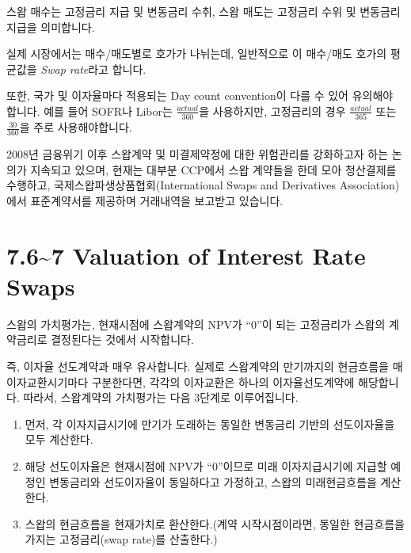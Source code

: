 \documentclass[
  letterpaper,
  DIV=11,
  numbers=noendperiod]{scrreprt}
\providecommand{\tightlist}{%
  \setlength{\itemsep}{0pt}\setlength{\parskip}{0pt}}\usepackage{longtable,booktabs,array}
\begin{document}
\begin{tcolorbox}[enhanced jigsaw, titlerule=0mm, bottomtitle=1mm, left=2mm, title=\textcolor{quarto-callout-tip-color}{\faLightbulb}\hspace{0.5em}{The organization of swap trading}, toptitle=1mm, bottomrule=.15mm, colframe=quarto-callout-tip-color-frame, breakable, opacityback=0, rightrule=.15mm, opacitybacktitle=0.6, coltitle=black, colback=white, arc=.35mm, colbacktitle=quarto-callout-tip-color!10!white, toprule=.15mm, leftrule=.75mm]

스왑 매수는 고정금리 지급 및 변동금리 수취, 스왑 매도는 고정금리 수위 및
변동금리 지급을 의미합니다.

실제 시장에서는 매수/매도별로 호가가 나뉘는데, 일반적으로 이 매수/매도
호가의 평균값을 \emph{Swap rate}라고 합니다.

또한, 국가 및 이자율마다 적용되는 Day count convention이 다를 수 있어
유의해야 합니다. 예를 들어 SOFR나 Libor는 \(\frac{actual}{360}\)을
사용하지만, 고정금리의 경우 \(\frac{actual}{365}\) 또는
\(\frac{30}{360}\)을 주로 사용해야합니다.

2008년 금융위기 이후 스왑계약 및 미결제약정에 대한 위험관리를 강화하고자
하는 논의가 지속되고 있으며, 현재는 대부분 CCP에서 스왑 계약들을 한데
모아 청산결제를 수행하고, 국제스왑파생상품협회(International Swaps and
Derivatives Association)에서 표준계약서를 제공하며 거래내역을 보고받고
있습니다.

\end{tcolorbox}

\section*{7.6\textasciitilde7 Valuation of Interest Rate
Swaps}\label{valuation-of-interest-rate-swaps}


스왑의 가치평가는, 현재시점에 스왑계약의 NPV가 ``0''이 되는 고정금리가
스왑의 계약금리로 결정된다는 것에서 시작합니다.

즉, 이자율 선도계약과 매우 유사합니다. 실제로 스왑계약의 만기까지의
현금흐름을 매 이자교환시기마다 구분한다면, 각각의 이자교환은 하나의
이자율선도계약에 해당합니다. 따라서, 스왑계약의 가치평가는 다음 3단계로
이루어집니다.

\begin{enumerate}
\def\labelenumi{(\arabic{enumi})}
\tightlist
\item
  먼저, 각 이자지급시기에 만기가 도래하는 동일한 변동금리 기반의
  선도이자율을 모두 계산한다.
\item
  해당 선도이자율은 현재시점에 NPV가 ``0''이므로 미래 이자지급시기에
  지급할 예정인 변동금리와 선도이자율이 동일하다고 가정하고, 스왑의
  미래현금흐름을 계산한다.
\item
  스왑의 현금흐름을 현재가치로 환산한다.(계약 시작시점이라면, 동일한
  현금흐름을 가지는 고정금리(swap rate)를 산출한다.)
\end{enumerate}
\end{document}
